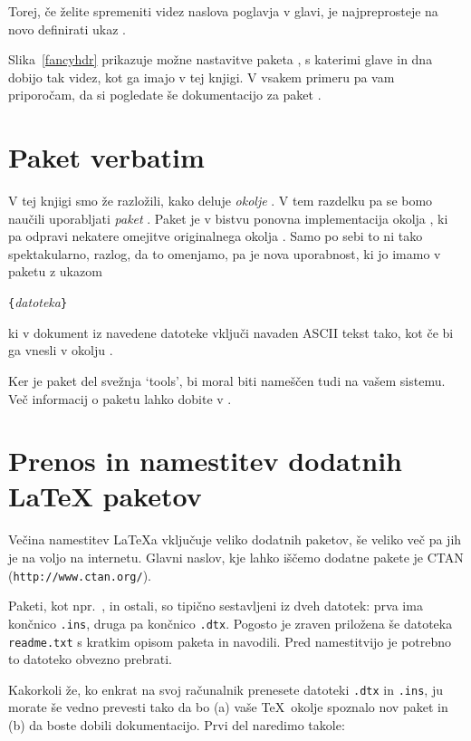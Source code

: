 Torej, če želite spremeniti videz naslova poglavja v glavi, je 
najpreprosteje 
na novo definirati ukaz . 
 
Slika~\ref{fancyhdr} prikazuje možne nastavitve paketa ,
s katerimi glave in dna dobijo tak videz, kot ga imajo v tej knjigi. 
V vsakem primeru pa vam priporočam, da si pogledate še dokumentacijo 
za paket . 

\section{Paket verbatim}

V tej knjigi smo že razložili, kako deluje \emph{okolje} .  
V tem razdelku pa se bomo naučili uporabljati 
\emph{paket} . Paket  je v bistvu 
ponovna implementacija okolja , ki pa odpravi nekatere 
omejitve originalnega okolja . Samo po sebi to ni tako spektakularno,
razlog, da to omenjamo, pa je nova uporabnost, ki jo imamo v paketu 
z ukazom
\begin{lscommand}
\verb|{|\emph{datoteka}\verb|}|
\end{lscommand}

\noindent ki v dokument iz navedene datoteke vključi navaden ASCII tekst tako, 
kot če bi ga vnesli v okolju .

Ker je paket  del svežnja `tools', bi moral biti nameščen tudi na vašem sistemu.
Več informacij o paketu lahko dobite v \cite{verbatim}. 

\section{Prenos in namestitev dodatnih \LaTeX{} paketov}\label{sec:Packages}

Večina namestitev \LaTeX{}a vključuje veliko dodatnih paketov,
še veliko več pa jih je na voljo na internetu. Glavni naslov, kje lahko iščemo dodatne pakete je 
CTAN (\verb|http://www.ctan.org/|).

Paketi, kot npr.~,  in ostali, so 
tipično sestavljeni iz dveh datotek: prva ima končnico 
\texttt{.ins}, druga pa končnico \texttt{.dtx}. Pogosto je zraven priložena 
še datoteka \texttt{readme.txt} s kratkim opisom paketa in navodili. 
Pred namestitvijo je potrebno to datoteko obvezno prebrati.

Kakorkoli že, ko enkrat na svoj računalnik prenesete datoteki \texttt{.dtx} in \texttt{.ins},
ju morate še vedno prevesti tako da bo (a) vaše 
\TeX\ okolje spoznalo nov paket in (b) da boste dobili dokumentacijo. 
Prvi del naredimo takole:


